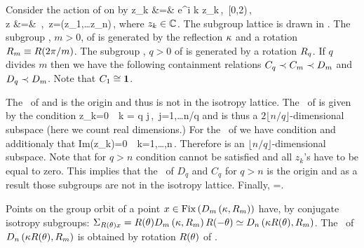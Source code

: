 \begin{example} %
 Consider the action of  on  by
 \bea
	\Rot{\theta} z_k &=& e^{i k \theta} z_k\,,\ \theta\in[0,2\pi)\,, \\
	\Refl z &=& \,,\  z=(z_1,\ldots z_n)\,,
	\label{eq:O2stndrd}
 \eea
where $z_k\in\mathbb{C}^{}$. The subgroup lattice is drawn in . The subgroup 
, $m>0$, of  is generated by the reflection $\kappa$ and a rotation $R_{m}\equiv R(2\pi/m)$. 
The subgroup , $q>0$ of  is generated by a rotation $R_{q}$.
If $q$ divides $m$ then we have the following containment relations $C_{q}\prec C_{m}\prec D_{m}$ 
and $D_{q}\prec D_{m}$. Note that $C_{1}\cong\mathbf{1}$.

The \fixedsp\ of  and  is the origin and thus  is not in the isotropy lattice. 
The \fixedsp\ of  is given by the condition
\beq
	z_k=0\ \ k = q j\,,\ j=1,\ldots\lfloor n/q \rfloor 
	\label{eq:O2CqFix}
\eeq
and is thus a $2 \lfloor n/q\rfloor$-dimensional subspace (here we count real dimensions.)  
For the \fixedsp\ of  we have condition  and additionaly that
\beq
	Im(z_k)=0\ \ k=1,\ldots,n\,.
\eeq 
Therefore  is an $ \lfloor n/q\rfloor$-dimensional subspace. Note that for $q>n$ condition
 cannot be satisfied and all $z_k$'s have to be equal to zero. This implies that the \fixedsp\ of $D_q$ and $C_q$ for $q>n$ is the origin and as a result those subgroups are not in the isotropy lattice. Finally, \Fix{\Idg}=.

Points on the group orbit of a point  $x\in\mathrm{Fix}\left(D_{m}\left(\kappa,R_{m}\right)\right)$ have, by  conjugate
isotropy subgroups: $\Sigma_{R(\theta)x}=R(\theta)D_{m}\left(\kappa,R_{m}\right)R(-\theta)\simeq D_{n}\left(\kappa R(\theta),R_{m}\right)$. The \fixedsp\ of $D_{n}\left(\kappa R(\theta),R_{m}\right)$ is obtained by rotation $R(\theta)$ of .





\end{example}
